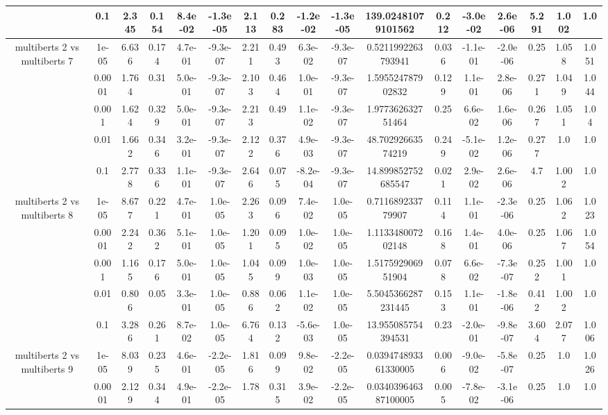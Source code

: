 \begin{tabular}{|c|c|c|c|c|c|c|c|c|c|c|c|c|c|c|c|c|}
 & 0.1 & 2.345 & 0.154 & 8.4e-02 & -1.3e-05 & 2.113 & 0.283 & -1.2e-02 & -1.3e-05 & 139.02481079101562 & 0.212 & -3.0e-02 & 2.6e-06 & 5.291 & 1.002 & 1.0 \\
\hline
\multirow{5}{*}{multiberts 2 vs multiberts 7} & 1e-05 & 6.636 & 0.174 & 4.7e-01 & -9.3e-07 & 2.211 & 0.493 & 6.3e-02 & -9.3e-07 & 0.5211992263793941 & 0.036 & -1.1e-01 & -2.0e-06 & 0.25 & 1.058 & 1.051 \\
 & 0.0001 & 1.764 & 0.31 & 5.0e-01 & -9.3e-07 & 2.103 & 0.464 & 1.0e-01 & -9.3e-07 & 1.595524787902832 & 0.129 & 1.1e-01 & 2.8e-06 & 0.271 & 1.049 & 1.044 \\
 & 0.001 & 1.624 & 0.329 & 5.0e-01 & -9.3e-07 & 2.213 & 0.49 & 1.1e-02 & -9.3e-07 & 1.977362632751464 & 0.25 & 6.6e-02 & 1.6e-06 & 0.267 & 1.051 & 1.04 \\
 & 0.01 & 1.662 & 0.346 & 3.2e-01 & -9.3e-07 & 2.122 & 0.376 & 4.9e-03 & -9.3e-07 & 48.70292663574219 & 0.249 & -5.1e-02 & 1.2e-06 & 0.277 & 1.0 & 1.0 \\
 & 0.1 & 2.778 & 0.336 & 1.1e-01 & -9.3e-07 & 2.646 & 0.075 & -8.2e-04 & -9.3e-07 & 14.899852752685547 & 0.021 & 2.9e-02 & 2.6e-06 & 4.7 & 1.002 & 1.0 \\
\hline
\multirow{5}{*}{multiberts 2 vs multiberts 8} & 1e-05 & 8.677 & 0.221 & 4.7e-01 & 1.0e-05 & 2.263 & 0.096 & 7.4e-02 & 1.0e-05 & 0.711689233779907 & 0.114 & 1.1e-01 & -2.3e-06 & 0.25 & 1.062 & 1.023 \\
 & 0.0001 & 2.242 & 0.362 & 5.1e-01 & 1.0e-05 & 1.201 & 0.095 & 1.0e-02 & 1.0e-05 & 1.113348007202148 & 0.168 & 1.4e-01 & 4.0e-06 & 0.25 & 1.067 & 1.054 \\
 & 0.001 & 1.165 & 0.176 & 5.0e-01 & 1.0e-05 & 1.045 & 0.099 & 1.0e-03 & 1.0e-05 & 1.517592906951904 & 0.078 & 6.6e-02 & -7.3e-07 & 0.252 & 1.001 & 1.0 \\
 & 0.01 & 0.806 & 0.05 & 3.3e-01 & 1.0e-05 & 0.886 & 0.062 & 1.1e-02 & 1.0e-05 & 5.5045366287231445 & 0.153 & 1.1e-01 & -1.8e-06 & 0.412 & 1.002 & 1.0 \\
 & 0.1 & 3.286 & 0.261 & 8.7e-02 & 1.0e-05 & 6.764 & 0.132 & -5.6e-03 & 1.0e-05 & 13.955085754394531 & 0.23 & -2.0e-01 & -9.8e-07 & 3.604 & 2.077 & 1.006 \\
\hline
\multirow{5}{*}{multiberts 2 vs multiberts 9} & 1e-05 & 8.039 & 0.235 & 4.6e-01 & -2.2e-05 & 1.816 & 0.099 & 9.8e-02 & -2.2e-05 & 0.039474893361330005 & 0.006 & -9.0e-02 & -5.8e-07 & 0.25 & 1.0 & 1.026 \\
 & 0.0001 & 2.129 & 0.344 & 4.9e-01 & -2.2e-05 & 1.78 & 0.315 & 3.9e-02 & -2.2e-05 & 0.034039646387100005 & 0.005 & -7.8e-02 & -3.1e-06 & 0.25 & 1.0 & 1.0 \\

\end{tabular}
